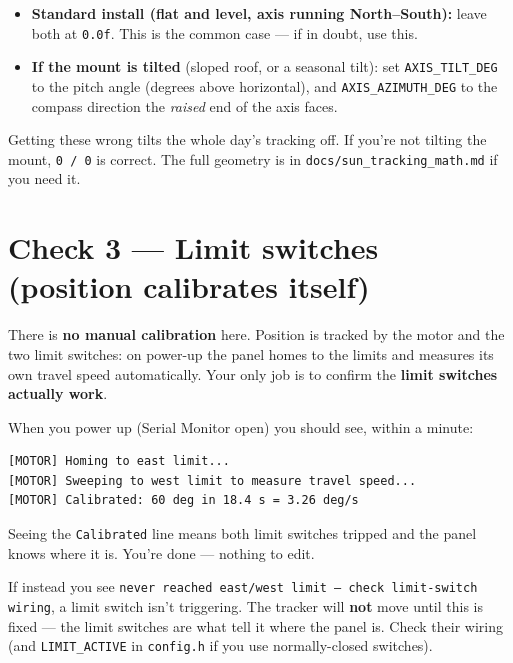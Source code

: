 \documentclass[11pt]{article}
\begin{document}
\begin{itemize}[leftmargin=1.6em]
  \item \textbf{Standard install (flat and level, axis running North--South):} leave
        both at \texttt{0.0f}. This is the common case --- if in doubt, use this.
  \item \textbf{If the mount is tilted} (sloped roof, or a seasonal tilt): set
        \texttt{AXIS\_TILT\_DEG} to the pitch angle (degrees above horizontal), and
        \texttt{AXIS\_AZIMUTH\_DEG} to the compass direction the \emph{raised} end
        of the axis faces.
\end{itemize}

\begin{note}
Getting these wrong tilts the whole day's tracking off. If you're not tilting the
mount, \texttt{0 / 0} is correct. The full geometry is in
\texttt{docs/sun\_tracking\_math.md} if you need it.
\end{note}

\section{Check 3 --- Limit switches (position calibrates itself)}
There is \textbf{no manual calibration} here. Position is tracked by the motor and
the two limit switches: on power-up the panel homes to the limits and measures its
own travel speed automatically. Your only job is to confirm the \textbf{limit
switches actually work}.

When you power up (Serial Monitor open) you should see, within a minute:
\begin{lstlisting}
[MOTOR] Homing to east limit...
[MOTOR] Sweeping to west limit to measure travel speed...
[MOTOR] Calibrated: 60 deg in 18.4 s = 3.26 deg/s
\end{lstlisting}
Seeing the \texttt{Calibrated} line means both limit switches tripped and the panel
knows where it is. You're done --- nothing to edit.

\begin{warn}
If instead you see \texttt{never reached east/west limit --- check limit-switch
wiring}, a limit switch isn't triggering. The tracker will \textbf{not} move until
this is fixed --- the limit switches are what tell it where the panel is. Check their
wiring (and \texttt{LIMIT\_ACTIVE} in \texttt{config.h} if you use normally-closed
switches).
\end{warn}
\end{document}
